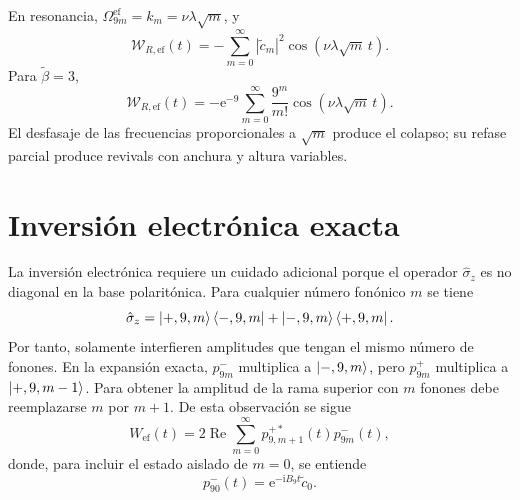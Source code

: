 \documentclass[11pt]{article}
\newcommand{\ii}{\mathrm{i}}
\newcommand{\ee}{\mathrm{e}}
\begin{document}
En resonancia, $\Omega_{9m}^{\mathrm{ef}}=k_m=\nu\lambda\sqrt m$, y
\begin{equation}
  \boxed{
  \mathcal W_{R,\mathrm{ef}}(t)
  =
  -
  \sum_{m=0}^{\infty}
  |\tilde c_m|^2\cos(\nu\lambda\sqrt m\,t).
  }
\end{equation}
Para $\tilde\beta=3$,
\begin{equation}
  \boxed{
  \mathcal W_{R,\mathrm{ef}}(t)
  =
  -\ee^{-9}
  \sum_{m=0}^{\infty}
  \frac{9^m}{m!}\cos(\nu\lambda\sqrt m\,t).
  }
\end{equation}
El desfasaje de las frecuencias proporcionales a $\sqrt m$ produce el colapso;
su refase parcial produce revivals con anchura y altura variables.

\section{Inversi\'on electr\'onica exacta}

La inversi\'on electr\'onica requiere un cuidado adicional porque el operador
$\hat\sigma_z$ es no diagonal en la base polarit\'onica. Para cualquier n\'umero
fon\'onico $m$ se tiene
\begin{equation}
  \hat\sigma_z
  =
  \ket{+,9,m}\bra{-,9,m}
  +
  \ket{-,9,m}\bra{+,9,m}.
\end{equation}
Por tanto, solamente interfieren amplitudes que tengan el mismo n\'umero de
fonones. En la expansi\'on exacta, $p_{9m}^-$ multiplica a
$\ket{-,9,m}$, pero $p_{9m}^+$ multiplica a $\ket{+,9,m-1}$. Para obtener la
amplitud de la rama superior con $m$ fonones debe reemplazarse $m$ por $m+1$.
De esta observaci\'on se sigue
\begin{equation}
  \boxed{
  W_{\mathrm{ef}}(t)
  =
  2\operatorname{Re}
  \sum_{m=0}^{\infty}
  p_{9,m+1}^{+*}(t)p_{9m}^-(t),
  }
\end{equation}
donde, para incluir el estado aislado de $m=0$, se entiende
\begin{equation}
  p_{90}^-(t)=\ee^{-\ii B_9t}\tilde c_0.
\end{equation}
\end{document}
